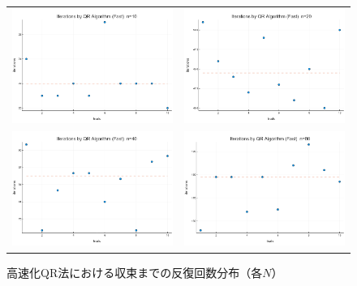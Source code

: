 \documentclass[a4paper,11pt]{ltjsarticle}
\begin{document}
\begin{figure}[H]
  \centering
  \begin{tabular}{cc}
    \includegraphics[width=72mm]{graphs/exp6_n10_iterations.png} &
    \includegraphics[width=72mm]{graphs/exp6_n20_iterations.png} \\
    \includegraphics[width=72mm]{graphs/exp6_n40_iterations.png} &
    \includegraphics[width=72mm]{graphs/exp6_n80_iterations.png} \\
  \end{tabular}
  \caption{高速化QR法における収束までの反復回数分布（各$N$）}
  \label{fig:exp6_iterations}
\end{figure}
\end{document}
